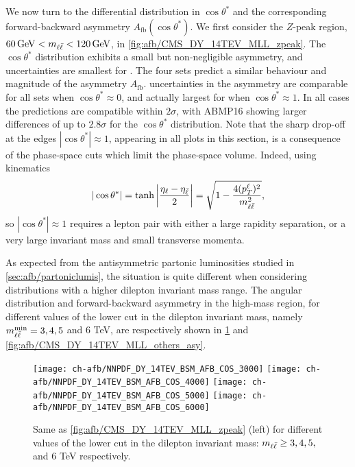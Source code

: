 We now turn to the differential distribution in $\cos\theta^*$ and the corresponding forward-backward asymmetry $A_{\text{fb}}(\cos\theta^*)$.
We first consider the $Z$-peak region,
$\SI{60}{\giga\electronvolt} < m_{\ell\bar{\ell}} < \SI{120}{\giga\electronvolt}$, in
\cref{fig:afb/CMS_DY_14TEV_MLL_zpeak}.
%
The $\cos\theta^*$ 
distribution exhibits a small but non-negligible asymmetry,
and uncertainties are  smallest for .
%
The four \pdf sets predict a similar behaviour and magnitude
of the asymmetry $A_\mathrm{fb}$.
%
\pdf uncertainties in the asymmetry
are  comparable for  all \pdf sets when $\cos\theta^* \approx0$,
and actually  largest for  when $\cos\theta^* \approx 1$.
In all cases the predictions are compatible within $2 \sigma$,
with ABMP16 showing larger differences of up to $2.8 \sigma$ for the $\cos\theta^*$
distribution.
%
Note that the
sharp drop-off at the edges $|\cos\theta^*| \approx  1$, appearing in
all plots in this section, is a consequence of the phase-space cuts which
limit the phase-space volume.
%
Indeed, using  \lo kinematics
\begin{equation}
| \cos\theta^* | = \tanh \left| \frac{\eta_\ell - \eta_{\bar{\ell}}}{2} \right| = \sqrt{1 - \frac{4 (p_T^\ell)^2}{m_{\ell\bar{\ell}}^2}} \text{,}
\end{equation}
so $| \cos\theta^* | \approx 1$ requires a lepton pair with either
a large rapidity separation, or a very large invariant mass and small
transverse momenta. 

As expected from the antisymmetric partonic luminosities studied in
\cref{sec:afb/partoniclumis}, the situation is quite different when
considering distributions with a higher dilepton invariant mass range.
%
The angular distribution and forward-backward asymmetry
in the high-mass region, for different values of the  lower cut in the dilepton
 invariant mass, namely $m_{\ell\bar{\ell}}^{\text{min}}=3, 4,5$ and 6 TeV, are
 respectively
 shown in
\cref{fig:afb/CMS_DY_14TEV_MLL_others} and \cref{fig:afb/CMS_DY_14TEV_MLL_others_asy}.

\begin{figure}[t!]
 \centering
 \texttt{[image: ch-afb/NNPDF\_DY\_14TEV\_BSM\_AFB\_COS\_3000]}
 \texttt{[image: ch-afb/NNPDF\_DY\_14TEV\_BSM\_AFB\_COS\_4000]}
 \texttt{[image: ch-afb/NNPDF\_DY\_14TEV\_BSM\_AFB\_COS\_5000]}
 \texttt{[image: ch-afb/NNPDF\_DY\_14TEV\_BSM\_AFB\_COS\_6000]}
 \caption{Same as \cref{fig:afb/CMS_DY_14TEV_MLL_zpeak} (left)
   for different values of the  lower cut in the dilepton
   invariant mass: $m_{\ell\bar{\ell}} \ge 3, 4,5,$ and 6 TeV respectively.
  }    
 \label{fig:afb/CMS_DY_14TEV_MLL_others}
\end{figure}

